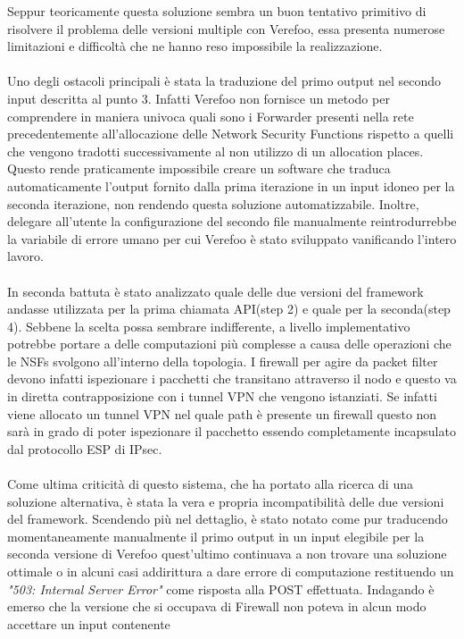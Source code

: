 Seppur teoricamente questa soluzione sembra un buon tentativo primitivo di risolvere il problema delle versioni multiple con Verefoo, 
essa presenta numerose limitazioni e difficoltà che ne hanno reso impossibile la realizzazione.
\\ \\
Uno degli ostacoli principali è stata la traduzione del primo output nel secondo input descritta al punto 3. Infatti Verefoo non fornisce un metodo per comprendere in maniera univoca quali sono i Forwarder presenti nella rete precedentemente all'allocazione
delle Network Security Functions rispetto a quelli che vengono tradotti successivamente al non utilizzo di un allocation places. Questo rende praticamente impossibile creare un software che traduca automaticamente l'output fornito dalla 
prima iterazione in un input idoneo per la seconda iterazione, non rendendo questa soluzione automatizzabile. Inoltre, delegare all'utente la configurazione del secondo file manualmente reintrodurrebbe la variabile di errore umano per cui Verefoo è stato sviluppato
vanificando l'intero lavoro.
\\ \\
In seconda battuta è stato analizzato quale delle due versioni del framework andasse utilizzata per la prima chiamata API(step 2) e quale per la seconda(step 4). Sebbene la scelta possa sembrare indifferente, a livello implementativo potrebbe portare a delle computazioni più complesse a causa delle operazioni che le NSFs
svolgono all'interno della topologia. I firewall per agire da packet filter devono infatti ispezionare i pacchetti che transitano attraverso il nodo e questo va in diretta contrapposizione con i tunnel VPN che vengono istanziati. Se infatti viene allocato un tunnel VPN nel quale path è presente un firewall questo non sarà in
grado di poter ispezionare il pacchetto essendo completamente incapsulato dal protocollo ESP di IPsec.
\\ \\ 
Come ultima criticità di questo sistema, che ha portato alla ricerca di una soluzione alternativa, è stata la vera e propria incompatibilità delle due versioni del framework. Scendendo più nel dettaglio, è stato notato come pur traducendo momentaneamente manualmente il primo output in un input elegibile per la seconda versione di 
Verefoo quest'ultimo continuava a non trovare una soluzione ottimale o in alcuni casi addirittura a dare errore di computazione restituendo un \textit{"503: Internal Server Error"} come risposta alla POST effettuata. Indagando è emerso che la versione che si occupava di Firewall non poteva in alcun modo accettare un input contenente

